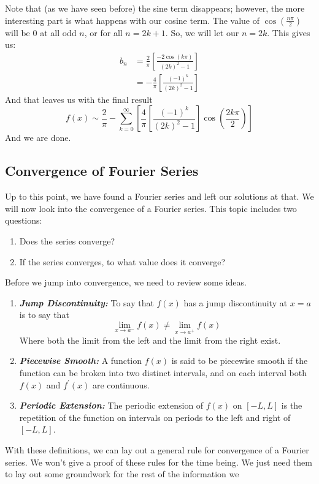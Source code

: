 \noindent Note that (as we have seen before) the sine term disappears; however,
the more interesting part is what happens with our cosine term. The value of
$\cos{\left(\frac{n\pi}{2}\right)}$ will be 0 at all odd $n$, or for all
$n = 2k + 1$. So, we will let our $n = 2k$. This gives us:
\begin{align*}
b_{n} &= \frac{2}{\pi} \left[ \frac{-2 \cos{\left(k \pi \right)}}{(2k)^{2} - 1}\right]\\
&= -\frac{4}{\pi}\left[\frac{(-1)^{k}}{(2k)^{2}-1}\right]
\end{align*}
\noindent And that leaves us with the final result
\[
f(x)\sim \frac{2}{\pi} - \sum_{k=0}^{\infty}\left[\frac{4}{\pi}\left[\frac{(-1)^{k}}{(2k)^{2}-1}\right]
\cos{\left(\frac{2k\pi}{2}\right)}\right]
\]
And we are done.
\newpage
\subsection{Convergence of Fourier Series}
\indent Up to this point, we have found a Fourier series and left our solutions
at that. We will now look into the convergence of a Fourier series. This topic
includes two questions:
\begin{enumerate}
\item Does the series converge?
\item If the series converges, to what value does it converge?
\end{enumerate}
\noindent Before we jump into convergence, we need to review some ideas.
\begin{enumerate}
\item \textit{\textbf{Jump Discontinuity:}} To say that $f(x)$ has a jump
discontinuity at $x = a$ is to say that
\[
\lim_{x \to a^{-}}f(x) \neq \lim_{x \to a^{+}}f(x)
\]
Where both the limit from the left and the limit from the right exist.
\item \textit{\textbf{Piecewise Smooth:}} A function $f(x)$ is said to be
piecewise smooth if the function can be broken into two distinct intervals, and
on each interval both $f(x)$ and $f^{'}(x)$ are continuous.
\item \textit{\textbf{Periodic Extension:}} The periodic extension of $f(x)$ on
$[-L,L]$ is the repetition of the function on intervals on periods to the left
and right of $[-L,L]$.
\end{enumerate}
\indent With these definitions, we can lay out a general rule for convergence of
a Fourier series. We won't give a proof of these rules for the time being. We
just need them to lay out some groundwork for the rest of the information we
